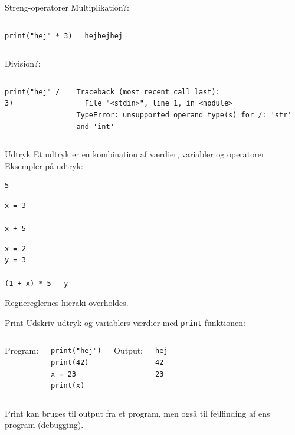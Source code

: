 \documentclass[10pt]{beamer}
\begin{document}
\begin{frame}[fragile]{Streng-operatorer}
	Multiplikation?:
	\begin{columns}
		\begin{lstlisting}[style=python]
print("hej" * 3)
		\end{lstlisting}
		\pause
		\begin{lstlisting}[style=python]
hejhejhej
		\end{lstlisting}
	\end{columns}
	\pause
	Division?:
	\begin{columns}
		\column{0.4\textwidth}
		\begin{lstlisting}[style=python]
print("hej" / 3)
		\end{lstlisting}
		\pause
		\column{0.4\textwidth}
		\begin{lstlisting}[style=python]
Traceback (most recent call last):
  File "<stdin>", line 1, in <module>
TypeError: unsupported operand type(s) for /: 'str' and 'int'
		\end{lstlisting}
	\end{columns}
\end{frame}

\begin{frame}[fragile]{Udtryk}
	Et udtryk er en kombination af værdier, variabler og operatorer\\
	Eksempler på udtryk:
	\begin{lstlisting}[style=python]
5
	\end{lstlisting}
	\begin{lstlisting}[style=python]
x = 3

x + 5
	\end{lstlisting}
	\begin{lstlisting}[style=python]
x = 2
y = 3

(1 + x) * 5 - y
	\end{lstlisting}
	Regnereglernes hieraki overholdes.
\end{frame}

\begin{frame}[fragile]{Print}
	Udskriv udtryk og variablers værdier med \texttt{print}-funktionen:
	\bigskip
	\begin{columns}
		Program:
		\begin{lstlisting}[style=python]
print("hej")
print(42)
x = 23
print(x)
		\end{lstlisting}
		Output:
		\begin{lstlisting}[style=python]
hej
42
23
		\end{lstlisting}
	\end{columns}
	Print kan bruges til output fra et program, men også til fejlfinding af ens program (debugging).
\end{frame}
\end{document}
